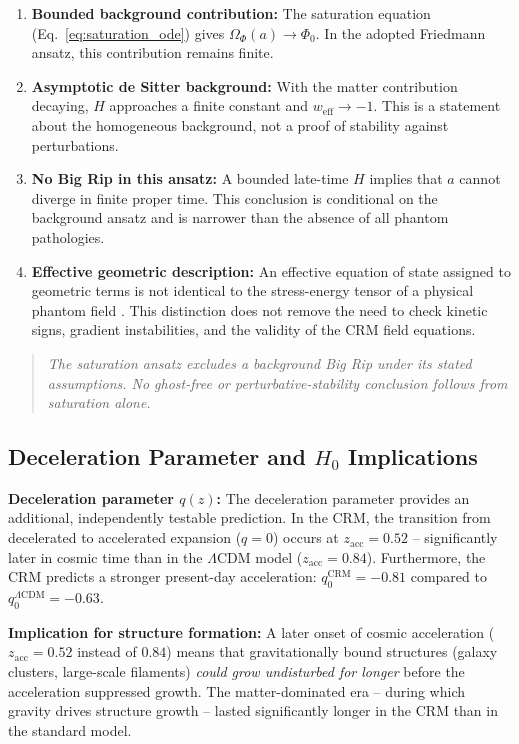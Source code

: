 \documentclass[aps,prd,twocolumn,superscriptaddress,nofootinbib]{revtex4-2}
\begin{document}
\begin{enumerate}
\item \textbf{Bounded background contribution:} The saturation equation (Eq.~\ref{eq:saturation_ode}) gives $\Omega_\Phi(a)\to\Phi_0$. In the adopted Friedmann ansatz, this contribution remains finite.
\item \textbf{Asymptotic de Sitter background:} With the matter contribution decaying, $H$ approaches a finite constant and $w_{\mathrm{eff}}\to-1$. This is a statement about the homogeneous background, not a proof of stability against perturbations.
\item \textbf{No Big Rip in this ansatz:} A bounded late-time $H$ implies that $a$ cannot diverge in finite proper time. This conclusion is conditional on the background ansatz and is narrower than the absence of all phantom pathologies.
\item \textbf{Effective geometric description:} An effective equation of state assigned to geometric terms is not identical to the stress-energy tensor of a physical phantom field \cite{Sotiriou2010}. This distinction does not remove the need to check kinetic signs, gradient instabilities, and the validity of the CRM field equations.
\end{enumerate}

\begin{quote}
\textit{The saturation ansatz excludes a background Big Rip under its stated assumptions. No ghost-free or perturbative-stability conclusion follows from saturation alone.}
\end{quote}


\subsection{Deceleration Parameter and $H_0$ Implications}
\label{subsec:deceleration}

\textbf{Deceleration parameter $q(z)$:} The deceleration parameter provides an additional, independently testable prediction. In the CRM, the transition from decelerated to accelerated expansion ($q = 0$) occurs at $z_{\mathrm{acc}} = 0.52$ -- significantly later in cosmic time than in the $\Lambda$CDM model ($z_{\mathrm{acc}} = 0.84$). Furthermore, the CRM predicts a stronger present-day acceleration: $q_0^{\mathrm{CRM}} = -0.81$ compared to $q_0^{\Lambda\mathrm{CDM}} = -0.63$.

\textbf{Implication for structure formation:} A later onset of cosmic acceleration ($z_{\mathrm{acc}} = 0.52$ instead of $0.84$) means that gravitationally bound structures (galaxy clusters, large-scale filaments) \textit{could grow undisturbed for longer} before the acceleration suppressed growth. The matter-dominated era -- during which gravity drives structure growth -- lasted significantly longer in the CRM than in the standard model.
\end{document}
